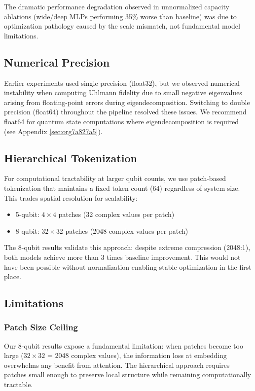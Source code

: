 \documentclass[11pt]{article}
\begin{document}
The dramatic performance degradation observed in unnormalized capacity ablations (wide/deep MLPs performing 35\% worse than baseline) was due to optimization pathology caused by the scale mismatch, not fundamental model limitations.
\subsection{Numerical Precision}
\label{sec:orge5f0acc}

Earlier experiments used single precision (float32), but we observed numerical instability when computing Uhlmann fidelity due to small negative eigenvalues arising from floating-point errors during eigendecomposition. Switching to double precision (float64) throughout the pipeline resolved these issues. We recommend float64 for quantum state computations where eigendecomposition is required (see Appendix \ref{sec:org7a827a5}).
\subsection{Hierarchical Tokenization}
\label{sec:orgddf4e0b}

For computational tractability at larger qubit counts, we use patch-based tokenization that maintains a fixed token count (64) regardless of system size. This trades spatial resolution for scalability:
\begin{itemize}
\item 5-qubit: \(4\times 4\) patches (32 complex values per patch)
\item 8-qubit: \(32\times 32\) patches (2048 complex values per patch)
\end{itemize}

The 8-qubit results validate this approach: despite extreme compression (2048:1), both models achieve more than 3 times baseline improvement. This would not have been possible without normalization enabling stable optimization in the first place.
\subsection{Limitations}
\label{sec:orgf2c7b1b}

\subsubsection{Patch Size Ceiling}
\label{sec:org636f0a0}

Our 8-qubit results expose a fundamental limitation: when patches become too large (\(32\times 32\) = 2048 complex values), the information loss at embedding overwhelms any benefit from attention. The hierarchical approach requires patches small enough to preserve local structure while remaining computationally tractable.
\end{document}
